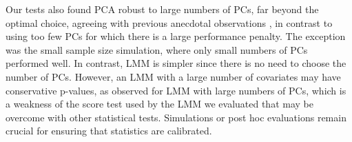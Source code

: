 \documentclass[11pt]{article}
\begin{document}
\begin{linenumbers}
Our tests also found PCA robust to large numbers of PCs, far beyond the optimal choice, agreeing with previous anecdotal observations \citep{price_principal_2006, kang_variance_2010}, in contrast to using too few PCs for which there is a large performance penalty.
The exception was the small sample size simulation, where only small numbers of PCs performed well.
In contrast, LMM is simpler since there is no need to choose the number of PCs.
However, an LMM with a large number of covariates may have conservative p-values, as observed for LMM with large numbers of PCs, which is a weakness of the score test used by the LMM we evaluated that may be overcome with other statistical tests.
Simulations or post hoc evaluations remain crucial for ensuring that statistics are calibrated.


\end{linenumbers}
\end{document}
